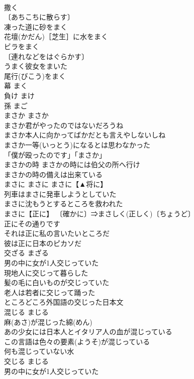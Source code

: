 \documentclass[8pt]{extreport}
\begin{document}
\begin{CJK}{UTF8}{min}
\\	撒く	
\\	〔あちこちに散らす〕
\\	凍った道に砂をまく 
\\	花壇(かだん)［芝生］に水をまく 
\\	ビラをまく 
\\	〔連れなどをはぐらかす〕
\\	うまく彼女をまいた 
\\	尾行(びこう)をまく 
\\	幕	まく	
\\	負け	まけ	
\\	孫	まご	
\\	まさか	まさか	
\\	まさか君がやったのではないだろうね 
\\	まさか本人に向かってばかだとも言えやしないしね 
\\	まさか一等(いっとう)になるとは思わなかった 
\\	「僕が殴ったのです」「まさか」 
\\	まさかの時 まさかの時には伯父の所へ行け 
\\	まさかの時の備えは出来ている 
\\	まさに	まさに	まさに【▲将に】　
\\	列車はまさに発車しようとしていた 
\\	まさに沈もうとするところを救われた 
\\	まさに【正に】 〔確かに〕⇒まさしく(正しく)〔ちょうど〕
\\	正にその通りです 
\\	それは正に私の言いたいところだ 
\\	彼は正に日本のピカソだ 
\\	交ざる	まざる	
\\	男の中に女が1人交じっていた 
\\	現地人に交じって暮らした 
\\	髪の毛に白いものが交じっていた 
\\	老人は若者に交じって踊った 
\\	ところどころ外国語の交じった日本文 
\\	混じる	まじる	
\\	麻(あさ)が混じった綿(めん) 
\\	あの少女には日本人とイタリア人の血が混じっている 
\\	この言語は色々の要素(ようそ)が混じっている 
\\	何も混じっていない水 
\\	交じる	まじる	
\\	男の中に女が1人交じっていた 

\end{CJK}
\end{document}
